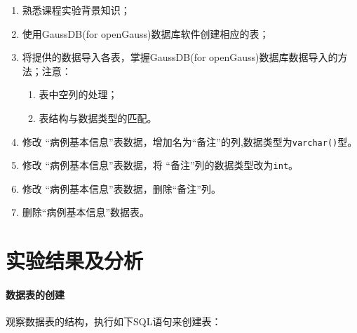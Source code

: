\documentclass[lang=cn,11pt,a4paper,cite=authornum]{paper}
\begin{document}
\begin{enumerate}
    \item 熟悉课程实验背景知识；
    \item 使用GaussDB(for openGauss)数据库软件创建相应的表；
    \item 将提供的数据导入各表，掌握GaussDB(for openGauss)数据库数据导入的方法；注意：
    \begin{enumerate}
        \item 表中空列的处理；
        \item 表结构与数据类型的匹配。
    \end{enumerate}	
    \item 修改 “病例基本信息”表数据，增加名为“备注”的列,数据类型为\texttt{varchar()}型。
    \item 修改 “病例基本信息”表数据，将 “备注”列的数据类型改为\texttt{int}。
    \item 修改 “病例基本信息”表数据，删除“备注”列。
    \item 删除“病例基本信息”数据表。
\end{enumerate}

\section{实验结果及分析}

\paragraph{数据表的创建}

观察数据表的结构，执行如下SQL语句来创建表：
\end{document}
